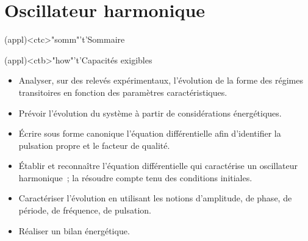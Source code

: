 \documentclass[../../main/main.tex]{subfiles}
\begin{document}
\setcounter{chapter}{3}


\chapter{Oscillateur harmonique}

\vspace*{\fill}

\begin{tcn}(appl)<ctc>"somm"'t'{Sommaire}
	\let\item\olditem
	\vspace{-15pt}
	\minitoc
	\vspace{-25pt}
\end{tcn}

\begin{tcn}[sidebyside](appl)<ctb>"how"'t'{Capacités exigibles}
	\begin{itemize}[label=\rcheck]
		\item Analyser, sur des relevés expérimentaux, l'évolution de la forme des
		      régimes transitoires en fonction des paramètres caractéristiques.
		\item Prévoir l'évolution du système à partir de considérations
		      énergétiques.
		\item Écrire sous forme canonique l'équation différentielle afin
		      d'identifier la pulsation propre et le facteur de qualité.
	\end{itemize}
	\tcblower
	\begin{itemize}[label=\rcheck]
		\item Établir et reconnaître l'équation différentielle qui caractérise un
		      oscillateur harmonique~; la résoudre compte tenu des conditions
		      initiales.
		\item Caractériser l'évolution en utilisant les notions d'amplitude, de
		      phase, de période, de fréquence, de pulsation.
		\item Réaliser un bilan énergétique.
	\end{itemize}
\end{tcn}

\vspace*{\fill}
\newpage
\vspace*{\fill}
\end{document}
